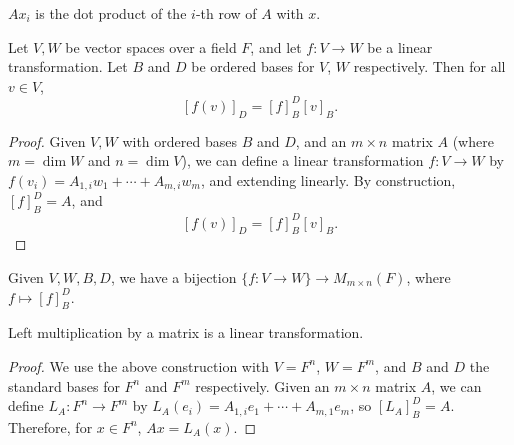 \documentclass[12pt]{article}
\begin{document}
\begin{rmk}
    $Ax_i$ is the dot product of the $i$-th row of $A$ with $x$.
\end{rmk}

\begin{thm}
    Let $V,W$ be vector spaces over a field $F$, and let $f: V \to W$ be a linear transformation. Let $B$ and $D$ be ordered bases for $V$, $W$ respectively. Then for all $v \in V$,
    \[[f(v)]_D = [f]_B^D[v]_B.\]
\end{thm}

\begin{proof}
    Given $V, W$ with ordered bases $B$ and $D$, and an $m \times n$ matrix $A$ (where $m = \dim W$ and $n = \dim V$), we can define a linear transformation $f: V \to W$ by $f(v_i) = A_{1,i}w_1 + \cdots + A_{m, i}w_m$, and extending linearly. By construction, $[f]_B^D = A$, and \[[f(v)]_D = [f]_B^D[v]_B.\]
\end{proof}

\begin{rmk}
    Given $V, W, B, D$, we have a bijection $\{f: V \to W\} \to M_{m \times n}(F)$, where $f \mapsto [f]_B^D$.
\end{rmk}

\begin{thm}
    Left multiplication by a matrix is a linear transformation.
\end{thm}

\begin{proof}
    We use the above construction with $V = F^n$, $W = F^m$, and $B$ and $D$ the standard bases for $F^n$ and $F^m$ respectively. Given an $m \times n$ matrix $A$, we can define $L_A: F^n \to F^m$ by $L_A(e_i) = A_{1,i}e_1 + \cdots + A_{m, 1}e_m$, so $[L_A]_B^D = A$. Therefore, for $x \in F^n$, $Ax = L_A(x)$.
\end{proof}
\end{document}
